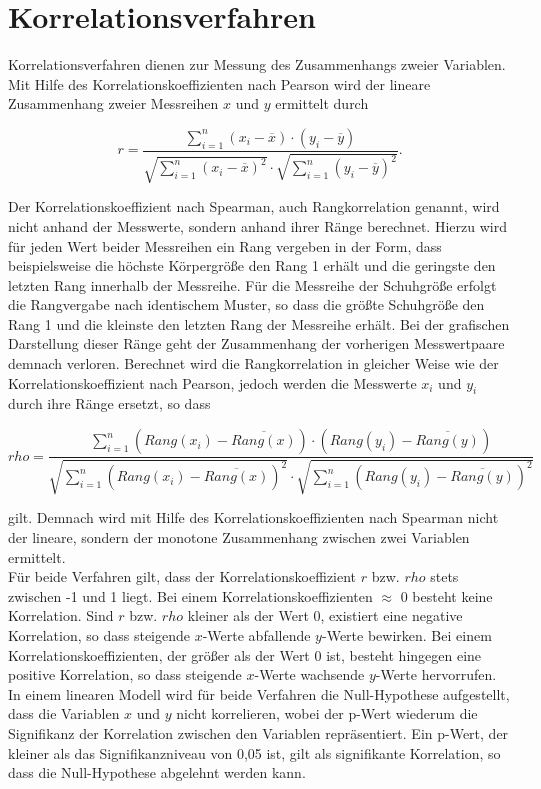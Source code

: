 \section{Korrelationsverfahren}

Korrelationsverfahren dienen zur Messung des Zusammenhangs zweier Variablen. Mit Hilfe des Korrelationskoeffizienten nach Pearson wird der lineare Zusammenhang zweier Messreihen $x$ und $y$ ermittelt durch

\begin{equation}
r =  \frac{\sum \limits_{i=1}^n (x_i-\overline{x}) \cdot (y_i-\overline{y})}{\sqrt{\sum \limits_{i=1}^n (x_i-\overline{x})^2} \cdot \sqrt{\sum \limits_{i=1}^n (y_i-\overline{y})^2}}.
	\label{eq:pearson}
\end{equation}

Der Korrelationskoeffizient nach Spearman, auch Rangkorrelation genannt, wird nicht anhand der Messwerte, sondern anhand ihrer Ränge berechnet. Hierzu wird für jeden Wert beider Messreihen ein Rang vergeben in der Form, dass beispielsweise die höchste Körpergröße den Rang 1 erhält und die geringste den letzten Rang innerhalb der Messreihe. Für die Messreihe der Schuhgröße erfolgt die Rangvergabe nach identischem Muster, so dass die größte Schuhgröße den Rang 1 und die kleinste den letzten Rang der Messreihe erhält. Bei der grafischen Darstellung dieser Ränge geht der Zusammenhang der vorherigen Messwertpaare demnach verloren. Berechnet wird die Rangkorrelation in gleicher Weise wie der Korrelationskoeffizient nach Pearson, jedoch werden die Messwerte $x_i$ und $y_i$ durch ihre Ränge ersetzt, so dass 

\begin{equation}
rho =  \frac{\sum \limits_{i=1}^n (Rang(x_i)-\overline{Rang(x)}) \cdot (Rang(y_i)-\overline{Rang(y)})}{\sqrt{\sum \limits_{i=1}^n (Rang(x_i)-\overline{Rang(x)})^2} \cdot \sqrt{\sum \limits_{i=1}^n (Rang(y_i)-\overline{Rang(y)})^2}}
	\label{eq:spearman}
\end{equation}

gilt. Demnach wird mit Hilfe des Korrelationskoeffizienten nach Spearman nicht der lineare, sondern der monotone Zusammenhang zwischen zwei Variablen ermittelt. \parencite{frank_einfach_2006}\\

Für beide Verfahren gilt, dass der Korrelationskoeffizient $r$ bzw. $rho$ stets zwischen -1 und 1 liegt. Bei einem Korrelationskoeffizienten $\approx$ 0 besteht keine Korrelation. Sind $r$ bzw. $rho$ kleiner als der Wert 0, existiert eine negative Korrelation, so dass steigende $x$-Werte abfallende $y$-Werte bewirken. Bei einem Korrelationskoeffizienten, der größer als der Wert 0 ist, besteht hingegen eine positive Korrelation, so dass steigende $x$-Werte wachsende $y$-Werte hervorrufen. In einem linearen Modell wird für beide Verfahren die Null-Hypothese aufgestellt, dass die Variablen $x$ und $y$ nicht korrelieren, wobei der p-Wert wiederum die Signifikanz der Korrelation zwischen den Variablen repräsentiert. Ein p-Wert, der kleiner als das Signifikanzniveau von 0,05 ist, gilt als signifikante Korrelation, so dass die Null-Hypothese abgelehnt werden kann. \parencite{frank_einfach_2006}

